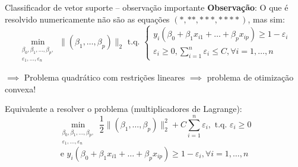 
\begin{frame}{Classificador de vetor suporte -- observação importante}
    \textbf{Observação}: O que é resolvido numericamente \alert{não} são as equações $(*, **, ***, ****)$, mas sim:
    $$\min_{\substack{\beta_0, \beta_1, \dots, \beta_p, \\ \varepsilon_1, \dots, \varepsilon_n}} \|(\beta_1, \dots, \beta_p)\|_2 \text{ t.q. } \begin{cases} y_i(\beta_0 + \beta_1 x_{i1} + \dots + \beta_p x_{ip}) \geq 1 - \varepsilon_i \\ \varepsilon_i \geq 0, \sum_{i = 1}^{n} \varepsilon_i \leq C, \forall i = 1, \dots, n\end{cases}$$
    
    \pause
    
    \begin{center}
        $\implies$ Problema quadrático com restrições lineares $\implies$ problema de otimização convexa!
    \end{center}
    
    \pause
    
    Equivalente a resolver o problema (multiplicadores de Lagrange):
    $$\min_{\substack{\beta_0, \beta_1, \dots, \beta_p, \\ \varepsilon_1, \dots, \varepsilon_n}} \frac{1}{2}\|(\beta_1, \dots, \beta_p)\|_2^2 + C\sum_{i = 1}^{n} \varepsilon_i, \text{ t.q. } \varepsilon_i \geq 0$$ $$\text{e } y_i(\beta_0 + \beta_1 x_{i1} + \dots + \beta_p x_{ip}) \geq 1 - \varepsilon_i, \forall i = 1, \dots, n$$

\end{frame}



